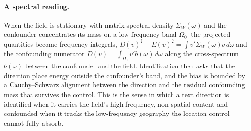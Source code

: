 \paragraph{A spectral reading.} When the field is stationary with matrix spectral
density $\Sigma_W(\omega)$ and the confounder concentrates its mass on a
low-frequency band $\Omega_0$, the projected quantities become frequency integrals,
$D(v)^2+E(v)^2=\int v'\Sigma_W(\omega)v\,d\omega$ and the confounding numerator
$D(v)=\int_{\Omega_0} v'b(\omega)\,d\omega$ along the cross-spectrum $b(\omega)$
between the confounder and the field. Identification then asks that the direction
place energy outside the confounder's band, and the bias is bounded by a
Cauchy--Schwarz alignment between the direction and the residual confounding mass
that survives the control. This is the sense in which a text direction is
identified when it carries the field's high-frequency, non-spatial content and
confounded when it tracks the low-frequency geography the location control cannot
fully absorb.
